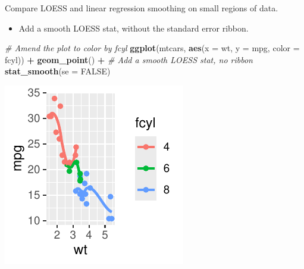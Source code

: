 \documentclass[
  ignorenonframetext,
]{beamer}
\newenvironment{Shaded}{\begin{snugshade}}{\end{snugshade}}
\newcommand{\AttributeTok}[1]{\textcolor[rgb]{0.13,0.29,0.53}{#1}}
\newcommand{\CommentTok}[1]{\textcolor[rgb]{0.56,0.35,0.01}{\textit{#1}}}
\newcommand{\ConstantTok}[1]{\textcolor[rgb]{0.56,0.35,0.01}{#1}}
\newcommand{\FunctionTok}[1]{\textcolor[rgb]{0.13,0.29,0.53}{\textbf{#1}}}
\newcommand{\NormalTok}[1]{#1}
\newcommand{\SpecialCharTok}[1]{\textcolor[rgb]{0.81,0.36,0.00}{\textbf{#1}}}
\providecommand{\tightlist}{%
  \setlength{\itemsep}{0pt}\setlength{\parskip}{0pt}}
\begin{document}
\begin{frame}[fragile]{Compare LOESS and linear regression smoothing on
small regions of data.}
\label{compare-loess-and-linear-regression-smoothing-on-small-regions-of-data.}
\begin{itemize}
\tightlist
\item
  Add a smooth LOESS stat, without the standard error ribbon.
\end{itemize}


\begin{Shaded}
\begin{Highlighting}[]
\CommentTok{\# Amend the plot to color by fcyl}
\FunctionTok{ggplot}\NormalTok{(mtcars, }\FunctionTok{aes}\NormalTok{(}\AttributeTok{x =}\NormalTok{ wt, }\AttributeTok{y =}\NormalTok{ mpg, }\AttributeTok{color =}\NormalTok{ fcyl)) }\SpecialCharTok{+} \FunctionTok{geom\_point}\NormalTok{() }\SpecialCharTok{+}
    \CommentTok{\# Add a smooth LOESS stat, no ribbon}
\FunctionTok{stat\_smooth}\NormalTok{(}\AttributeTok{se =} \ConstantTok{FALSE}\NormalTok{)}
\end{Highlighting}
\end{Shaded}

\begin{center}\includegraphics[width=0.5\linewidth]{Figs/unnamed-chunk-11-1} \end{center}
\end{frame}
\end{document}
